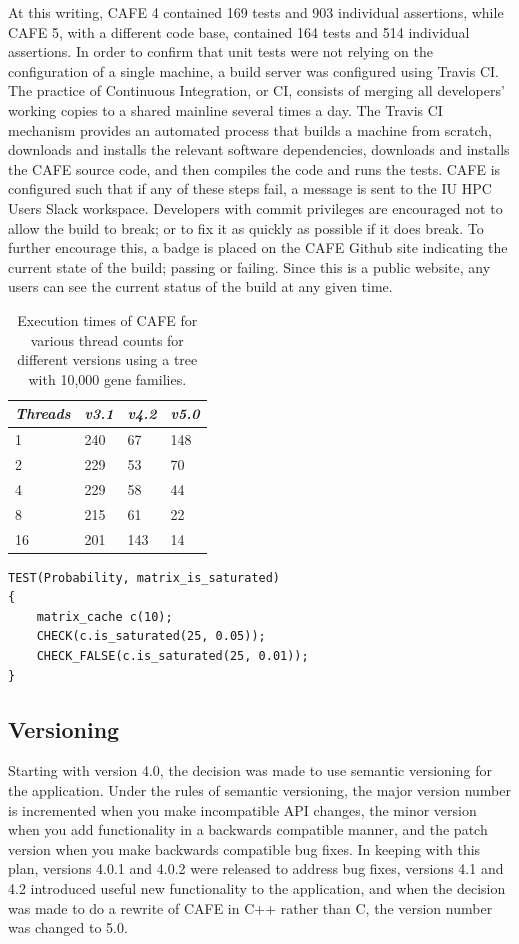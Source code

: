 \documentclass[acmtog, authorversion]{acmart}
\begin{document}
At this writing, CAFE 4 contained 169 tests and 903 individual assertions, while CAFE 5, with a different code base, contained 164 tests and 514 individual assertions. In order to confirm that unit tests were not relying on the configuration of a single machine, a build server was configured using Travis CI. The practice of Continuous Integration, or CI, consists of merging all developers' working copies to a shared mainline several times a day. The Travis CI mechanism provides an automated process that builds a machine from scratch, downloads and installs the relevant software dependencies, downloads and installs the CAFE source code, and then compiles the code and runs the tests. CAFE is configured such that if any of these steps fail, a message is sent to the IU HPC Users Slack workspace. Developers with commit privileges are encouraged not to allow the build to break; or to fix it as quickly as possible if it does break. To further encourage this, a badge is placed on the CAFE Github site indicating the current state of the build; passing or failing. Since this is a public website, any users can see the current status of the build at any given time.

\begin{table}[t] \label{tab:versionscale}
\begin{tabular}{@{} *4l @{}}    \toprule
\emph{Threads} & \emph{v3.1} & \emph{v4.2} & \emph{v5.0}  \\\midrule
  1 & 240 & 67    & 148 \\
  2 & 229 & 53    &  70 \\
  4 & 229 & 58    &  44 \\
  8 & 215 & 61    &  22    \\
  16 & 201 & 143  &  14\\ \bottomrule
 \hline
\end{tabular}
\caption{Execution times of CAFE for various thread counts for different versions using a tree with 10,000 gene families.}
\end{table}

\begin{lstlisting}[caption={A sample unit test},label={lst:test}]
TEST(Probability, matrix_is_saturated)
{
    matrix_cache c(10);
    CHECK(c.is_saturated(25, 0.05));
    CHECK_FALSE(c.is_saturated(25, 0.01));
}
\end{lstlisting}
\subsection{Versioning}
Starting with version 4.0, the decision was made to use semantic versioning for the application. Under the rules of semantic versioning, the major version number is incremented when you make incompatible API changes, the minor version when you add functionality in a backwards compatible manner, and the patch version when you make backwards compatible bug fixes. In keeping with this plan, versions 4.0.1 and 4.0.2 were released to address bug fixes, versions 4.1 and 4.2 introduced useful new functionality to the application, and when the decision was made to do a rewrite of CAFE in C++ rather than C, the version number was changed to 5.0.
\end{document}
